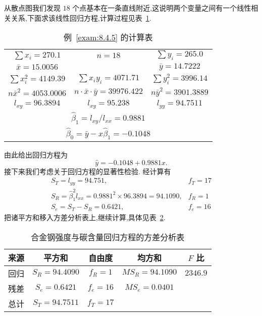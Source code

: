\begin{example}
    从散点图我们发现 $18$ 个点基本在一条直线附近,这说明两个变量之间有一个线性相关关系,下面求该线性回归方程,计算过程见表~\ref{tab:8.4.5}.
    \begin{table}[htbp]
      \renewcommand*{\arraystretch}{1.5}
        \centering
        \caption{例~\ref{exam:8.4.5} 的计算表}
        \begin{tabular}{ccc}
          \toprule
         $\sum x_i=270.1$   &    $n=18$     &  $\sum y_i=265.0$  \\
         $\bar{x}=15.0056$   &       &  $\bar{y}=14.7222$  \\
         $\sum x_{i}^{2}=4149.39$   &    $\sum x_iy_i=4071.71$     &  $\sum y_{i}^{2}=3996.14$  \\
         $n\bar{x}^2=4053.0006$   &    $n \cdot\bar{x} \cdot \bar{y}=39976.422$     &  $n\bar{y}^2=3901.3889$  \\
         $l_{xy}=96.3894$   &    $l_{xy}=95.238$     &  $l_{yy}=94.7511$  \\
         \midrule
            \multicolumn{3}{c}{ $\hat{\beta}_1=l_{xy}/l_{xx}=0.9881$ } \\
            \multicolumn{3}{c}{ $\hat{\beta}_0=\bar{y}-x\hat{\beta}_1=-0.1048$ } \\
        \bottomrule
        \end{tabular}%
        \label{tab:8.4.5}%
    \end{table}%


    由此给出回归方程为
    \begin{equation}
    \hat{y}= - 0.1048 + 0.9881x. \label{eq:8.4.25}
    \end{equation}
    接下来我们考虑关于回归方程的显著性检验. 经计算有
    \begin{equation*}
    \begin{array}{ll}{S_{T}=l_{y y}=94.751,} & {f_{T}=17} \\ {S_{R}=\hat{\beta}_{1}^{2} l_{x x}=0.9881^{2} \times 96.3894=94.1090,} & {f_{R}=1} \\ {S_{e}=S_{T}-S_{R}=0.6421,} & {f_{e}=16}\end{array}
    \end{equation*}
    把诸平方和移入方差分析表上,继续计算,具体见表~\ref{tab:8.4.6}.
    \begin{table}[htbp]
        \centering
        \caption{合金钢强度与碳含量回归方程的方差分析表}
        \begin{tabular}{ccccc}
            \toprule
            来源    &  平方和  & 自由度   & 均方和   & $ F$ 比 \\\midrule %
            回归    &  $S_R=94.4090$  & $ f_R=1$   &  $MS_R=94.1090$  &  $2346.9$  \\
            残差    &  $S_e=0.6421$  &  $f_e=16$  &  $MS_e=0.0401$  &  \\\midrule
            总计    &  $S_T=94.7511$  &  $f_T=17$  &       &  \\\bottomrule
        \end{tabular}%
        \label{tab:8.4.6}%
    \end{table}%


\end{example}
